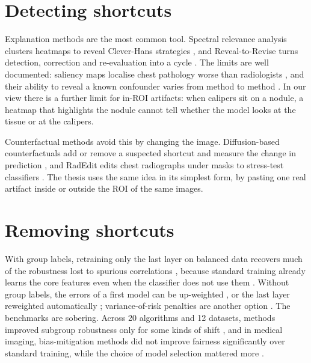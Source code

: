 \documentclass[11pt,a4paper]{article}
\begin{document}
\section{Detecting shortcuts}
Explanation methods are the most common tool. Spectral relevance analysis clusters heatmaps to reveal Clever-Hans
strategies \citep{anders2022clever}, and Reveal-to-Revise turns detection, correction and re-evaluation into a cycle
\citep{pahde2023r2r}. The limits are well documented: saliency maps localise chest pathology worse than radiologists
\citep{saporta2022saliency}, and their ability to reveal a known confounder varies from method to method
\citep{sun2023right}. In our view there is a further limit for in-ROI artifacts: when calipers sit on a nodule, a heatmap
that highlights the nodule cannot tell whether the model looks at the tissue or at the calipers.

Counterfactual methods avoid this by changing the image. Diffusion-based counterfactuals add or remove a suspected
shortcut and measure the change in prediction \citep{weng2024fastdime}, and RadEdit edits chest radiographs under masks
to stress-test classifiers \citep{perezgarcia2024radedit}. The thesis uses the same idea in its simplest form, by
pasting one real artifact inside or outside the ROI of the same images.

\section{Removing shortcuts}
With group labels, retraining only the last layer on balanced data recovers much of the robustness lost to spurious
correlations \citep{kirichenko2023dfr}, because standard training already learns the core features even when the
classifier does not use them \citep{izmailov2022feature}. Without group labels, the errors of a first model can be
up-weighted \citep{liu2021jtt}, or the last layer reweighted automatically \citep{qiu2023afr}; variance-of-risk
penalties are another option \citep{krueger2021rex}. The benchmarks are sobering. Across 20 algorithms and 12 datasets,
methods improved subgroup robustness only for some kinds of shift \citep{yang2023change}, and in medical imaging,
bias-mitigation methods did not improve fairness significantly over standard training, while the choice of model
selection mattered more \citep{zong2023medfair}.
\end{document}
